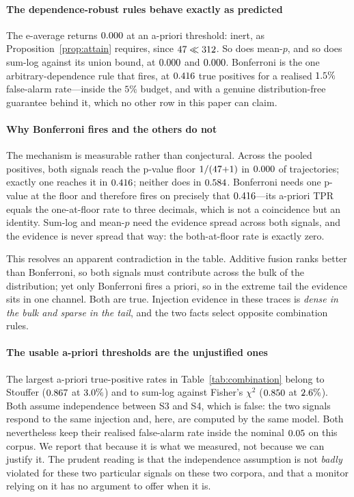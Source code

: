 \documentclass[preprint,12pt,authoryear]{elsarticle}
\theoremstyle{definition}
\begin{document}
\paragraph{The dependence-robust rules behave exactly as predicted}
The e-average returns $0.000$ at an a-priori threshold: inert, as
Proposition~\ref{prop:attain} requires, since $47 \ll 312$. So does
mean-$p$, and so does sum-log against its union bound, at
$0.000$ and $0.000$. Bonferroni is the one
arbitrary-dependence rule that fires, at $0.416$ true positives for a
realised $1.5\%$ false-alarm rate---inside the $5\%$ budget, and with
a genuine distribution-free guarantee behind it, which no other row in this paper
can claim.

\paragraph{Why Bonferroni fires and the others do not}
The mechanism is measurable rather than conjectural. Across the pooled positives,
both signals reach the p-value floor $1/(47{+}1)$ in $0.000$ of
trajectories; exactly one reaches it in $0.416$; neither does in
$0.584$. Bonferroni needs one p-value at the floor and therefore fires on
precisely that $0.416$---its a-priori TPR equals the one-at-floor rate to
three decimals, which is not a coincidence but an identity. Sum-log and mean-$p$
need the evidence spread across both signals, and the evidence is never spread
that way: the both-at-floor rate is exactly zero.

This resolves an apparent contradiction in the table. Additive fusion ranks better
than Bonferroni, so both signals must contribute across the bulk of the
distribution; yet only Bonferroni fires a priori, so in the extreme tail the
evidence sits in one channel. Both are true. Injection evidence in these traces is
\emph{dense in the bulk and sparse in the tail}, and the two facts select opposite
combination rules.

\paragraph{The usable a-priori thresholds are the unjustified ones}
The largest a-priori true-positive rates in Table~\ref{tab:combination} belong to
Stouffer ($0.867$ at $3.0\%$) and to sum-log against
Fisher's $\chi^2$ ($0.850$ at $2.6\%$). Both assume
independence between S3 and S4, which is false: the two signals respond to the
same injection and, here, are computed by the same model. Both nevertheless keep
their realised false-alarm rate inside the nominal $0.05$ on this corpus. We
report that because it is what we measured, not because we can justify it. The
prudent reading is that the independence assumption is not \emph{badly} violated
for these two particular signals on these two corpora, and that a monitor relying
on it has no argument to offer when it is.
\end{document}

